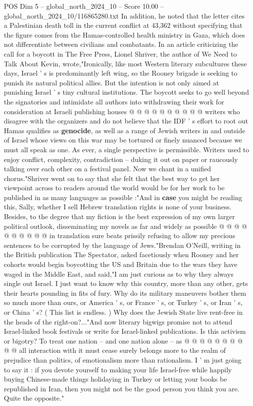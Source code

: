 \begin{textsample}{POS Dim 5 – global\_north\_2024\_10 – Score 10.00 – global\_north\_2024\_10/116865280.txt}
In addition, he noted that the letter cites a Palestinian death toll in the current conflict at 43,362 without specifying that the figure comes from the Hamas-controlled health ministry in Gaza, which does not differentiate between civilians and combatants.
In an article criticizing the call for a boycott in The Free Press, Lionel Shriver, the author of We Need to Talk About Kevin, wrote,"Ironically, like most Western literary subcultures these days, Israel ' s is predominantly left wing, so the Rooney brigade is seeking to punish its natural political allies.
But the intention is not only aimed at punishing Israel ' s tiny cultural institutions.
The boycott seeks to go well beyond the signatories and intimidate all authors into withdrawing their work for consideration at Israeli publishing houses @ @ @ @ @ @ @ @ @ @ writers who disagree with the organizers and do not believe that the IDF ' s effort to root out Hamas qualifies as \textbf{genocide}, as well as a range of Jewish writers in and outside of Israel whose views on this war may be tortured or finely nuanced because we must all speak as one.
As ever, a single perspective is permissible.
Writers used to enjoy conflict, complexity, contradiction -- duking it out on paper or raucously talking over each other on a festival panel.
Now we chant in a unified chorus."Shriver went on to say that she felt that the best way to get her viewpoint across to readers around the world would be for her work to be published in as many languages as possible :"And in \textbf{case} you might be reading this, Sally, whether I sell Hebrew translation rights is none of your business.
Besides, to the degree that my fiction is the best expression of my own larger political outlook, disseminating my novels as far and widely as possible @ @ @ @ @ @ @ @ @ @ in translation sure beats prissily refusing to allow my precious sentences to be corrupted by the language of Jews."Brendan O'Neill, writing in the British publication The Spectator, asked facetiously when Rooney and her cohorts would begin boycotting the US and Britain due to the wars they have waged in the Middle East, and said,"I am just curious as to why they always single out Israel.
I just want to know why this country, more than any other, gets their hearts pounding in fits of fury.
Why do its military maneuvers bother them so much more than ours, or America ' s, or France ' s, or Turkey ' s, or Iran ' s, or China ' s? ( This list is endless. ) Why does the Jewish State live rent-free in the heads of the right-on?..."And now literary bigwigs promise not to attend Israel-linked book festivals or write for Israel-linked publications.
Is this activism or bigotry?
To treat one nation -- and one nation alone -- as @ @ @ @ @ @ @ @ @ @ all interaction with it must cease surely belongs more to the realm of prejudice than politics, of emotionalism more than rationalism.
I ' m just going to say it : if you devote yourself to making your life Israel-free while happily buying Chinese-made things holidaying in Turkey or letting your books be republished in Iran, then you might not be the good person you think you are.
Quite the opposite."


\end{textsample}
